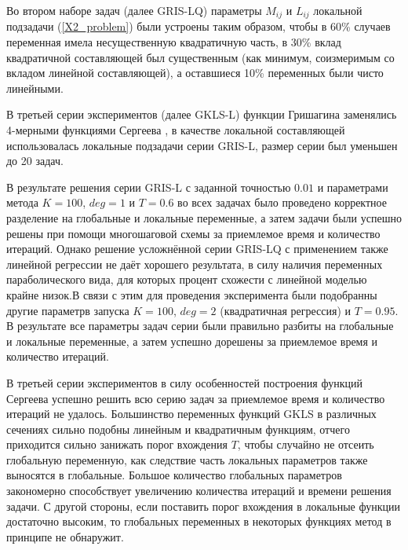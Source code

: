 \documentclass{aip-cp}
\begin{document}
Во втором наборе задач (далее GRIS-LQ) параметры $M_{ij}$ и $L_{ij}$ локальной подзадачи (\ref{X2_problem}) были устроены таким образом, чтобы в 60\% случаев переменная имела несущественную квадратичную часть, в 30\% вклад квадратичной составляющей был существенным (как минимум, соизмеримым со вкладом линейной составляющей), а оставшиеся 10\% переменных были чисто линейными.

В третьей серии экспериментов (далее GKLS-L) функции Гришагина заменялись 4-мерными функциями Сергеева \cite{}, в качестве локальной составляющей использовалась локальные подзадачи серии GRIS-L, размер серии был уменьшен до 20 задач.

В результате решения серии GRIS-L с заданной точностью $0.01$ и параметрами метода $K=100$, $deg=1$ и $T=0.6$ во всех задачах было проведено корректное разделение на глобальные и локальные переменные, а затем задачи были успешно решены при помощи многошаговой схемы за приемлемое время и количество итераций. Однако решение усложнённой серии GRIS-LQ с применением также линейной регрессии не даёт хорошего результата, в силу наличия переменных параболического вида, для которых процент схожести с линейной моделью крайне низок.В связи с этим для проведения эксперимента были подобранны другие параметрв запуска $K=100$, $deg=2$ (квадратичная регрессия) и $T=0.95$. В результате все параметры задач серии были правильно разбиты на глобальные и локальные переменные, а затем успешно дорешены за приемлемое время и количество итераций.
 

В третьей серии экспериментов в силу особенностей построения функций Сергеева успешно решить всю серию задач за приемлемое время и количество итераций не удалось. Большинство переменных функций GKLS в различных сечениях сильно подобны линейным и квадратичным функциям, отчего приходится сильно занижать порог вхождения $T$, чтобы случайно не отсеить глобальную переменную, как следствие часть локальных параметров также выносятся в глобальные. Большое количество глобальных параметров закономерно способствует увеличению количества итераций и времени решения задачи. С другой стороны, если поставить порог вхождения в локальные функции достаточно высоким, то глобальных переменных в некоторых функциях метод в принципе не обнаружит.
\end{document}
